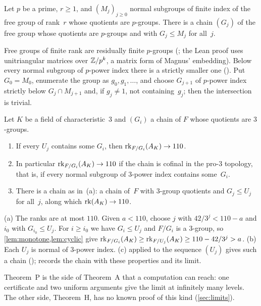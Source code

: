 \begin{lemma}\label{lem:pchain}
Let $p$ be a prime, $r\ge1$, and $(M_j)_{j\ge0}$ normal subgroups of finite index of the free group of rank~$r$ whose
quotients are $p$-groups. There is a chain $(G_j)$ of the free group whose quotients are $p$-groups and with
$G_j\le M_j$ for all~$j$.
\end{lemma}
\begin{outline}
Free groups of finite rank are residually finite $p$-groups (; the Lean
proof uses unitriangular matrices over $\mathbb{Z}/p^k$, a matrix form of Magnus' embedding). Below every normal subgroup of
$p$-power index there is a strictly smaller one (). Put $G_0=M_0$,
enumerate the group as $g_0,g_1,\dots$, and choose $G_{j+1}$ of $p$-power index strictly below $G_j\cap M_{j+1}$ and, if
$g_j\ne1$, not containing~$g_j$; then the intersection is trivial.
\end{outline}

\begin{theorem}\label{thm:P}
Let $K$ be a field of characteristic~$3$ and $(G_i)$ a chain of $F$ whose quotients are $3$-groups.
\begin{enumerate}[label=(\alph*)]
\item If every $U_j$ contains some $G_i$, then $\operatorname{rk}_{F/G_i}(A_K)\to110$.
\item In particular $\operatorname{rk}_{F/G_i}(A_K)\to110$ if the chain is cofinal in the pro-$3$ topology, that is, if every normal
subgroup of $3$-power index contains some~$G_i$.
\item There is a chain as in~(a): a chain of~$F$ with $3$-group quotients and $G_j\le U_j$ for all~$j$, along which
$\operatorname{rk}(A_K)\to110$.
\end{enumerate}
\end{theorem}
\begin{outline}
(a) The ranks are at most $110$. Given $a<110$, choose $j$ with $42/3^j<110-a$ and $i_0$ with $G_{i_0}\le U_j$. For
$i\ge i_0$ we have $G_i\le U_j$ and $F/G_i$ is a $3$-group, so \cref{lem:monotone,lem:cyclic} give
$\operatorname{rk}_{F/G_i}(A_K)\ge\operatorname{rk}_{F/U_j}(A_K)\ge110-42/3^j>a$. (b) Each $U_j$ is normal of $3$-power index. (c) 
applied to the sequence $(U_j)$ gives such a chain (); 
records the chain with these properties and its limit.
\end{outline}

Theorem~P is the side of Theorem~A that a computation can reach: one certificate and two uniform arguments give the limit
at infinitely many levels. The other side, Theorem~H, has no known proof of this kind (\cref{sec:limits}).

